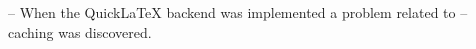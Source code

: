 -- When the QuickLaTeX backend was implemented a problem related to
-- caching was discovered.

\begin{code}%
%
\>[2]\AgdaSpace{}%
\AgdaSpace{}%
\AgdaSymbol{:}\AgdaSpace{}%
\<%
\end{code}
